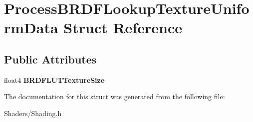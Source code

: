 \hypertarget{structProcessBRDFLookupTextureUniformData}{}\section{Process\+B\+R\+D\+F\+Lookup\+Texture\+Uniform\+Data Struct Reference}
\label{structProcessBRDFLookupTextureUniformData}
\subsection*{Public Attributes}
\begin{DoxyCompactItemize}
\item 
\mbox{\label{structProcessBRDFLookupTextureUniformData_afb85f5dacc539ef1a4add07734830234}} 
float4 {\bfseries B\+R\+D\+F\+L\+U\+T\+Texture\+Size}
\end{DoxyCompactItemize}


The documentation for this struct was generated from the following file\+:\begin{DoxyCompactItemize}
\item 
Shaders/Shading.\+h\end{DoxyCompactItemize}
